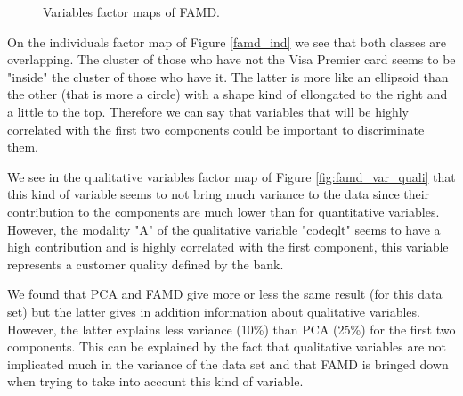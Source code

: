 \iffalse
\vspace{-1.25cm}
\begin{figure}[H]
    \centering
    
    \caption{Quantitative variables factor map.}
    \label{fig:famd_var_quanti}
\end{figure}
\fi

\vspace{-0.25cm}
\begin{figure}[H]
\caption{Variables factor maps of FAMD.}
\label{fig:famd_var}
\end{figure}

On the individuals factor map of Figure \ref{famd_ind} we see that both classes are overlapping. The cluster of those who have not the Visa Premier card seems to be "inside" the cluster of those who have it. The latter is more like an ellipsoid than the other (that is more a circle) with a shape kind of ellongated to the right and a little to the top. Therefore we can say that variables that will be highly correlated with the first two components could be important to discriminate them.

We see in the qualitative variables factor map of Figure \ref{fig:famd_var_quali} that this kind of variable seems to not bring much variance to the data since their contribution to the components are much lower than for quantitative variables. However, the modality "A" of the qualitative variable "codeqlt" seems to have a high contribution and is highly correlated with the first component, this variable represents a customer quality defined by the bank.

We found that PCA and FAMD give more or less the same result (for this data set) but the latter gives in addition information about qualitative variables. However, the latter explains less variance (10\%) than PCA (25\%) for the first two components. This can be explained by the fact that qualitative variables are not implicated much in the variance of the data set and that FAMD is bringed down when trying to take into account this kind of variable.


